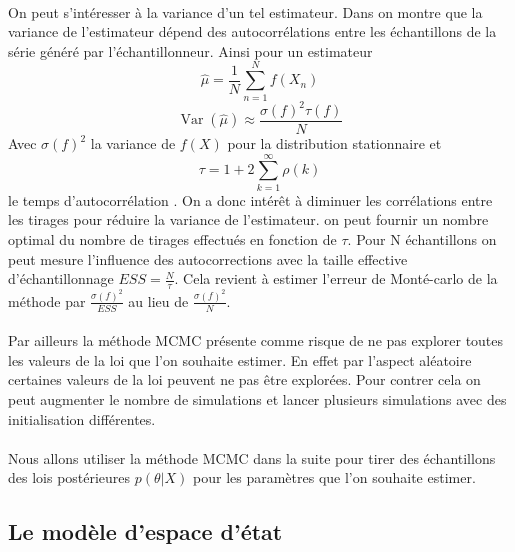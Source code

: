 \documentclass{article}
\theoremstyle{definition}
\theoremstyle{remark}
\begin{document}
\paragraph{}
On peut s'intéresser à la variance d'un tel estimateur. Dans \cite{coursgibbs} on montre que la variance de l'estimateur dépend
des autocorrélations entre les échantillons de la série généré par l'échantillonneur. 
Ainsi pour un estimateur 
\begin{equation}
	\hat{\mu}=\frac{1}{N} \sum_{n=1}^{N} f\left(X_{n}\right)
\end{equation}
\begin{equation}
	\operatorname{Var}(\hat{\mu}) \approx \frac{\sigma(f)^{2} \tau(f)}{N}
	\end{equation}
Avec $\sigma(f)^{2}$ la variance de $f(X)$ pour la distribution stationnaire et $$\tau=1+2 \sum_{k=1}^{\infty} \rho(k) $$ 
le \og{}temps d'autocorrélation \fg. On a donc intérêt à diminuer les corrélations entre les tirages pour réduire la variance de l'estimateur.
on peut fournir un nombre optimal du nombre de tirages effectués en fonction de $\tau$.
Pour N échantillons on peut mesure l'influence des autocorrections avec la taille effective d'échantillonnage
$ESS = \frac{N}{\tau}$. Cela revient à estimer l'erreur de Monté-carlo de la méthode par $\frac{\sigma(f)^{2}}{ESS}$ 
au lieu de $\frac{\sigma(f)^{2}}{N}$. 

\paragraph{}
Par ailleurs la méthode MCMC présente comme risque de ne pas explorer toutes les valeurs de la loi que l'on souhaite estimer. 
En effet par l'aspect aléatoire certaines valeurs de la loi peuvent ne pas être explorées. Pour contrer cela on peut augmenter le nombre de simulations 
et lancer plusieurs simulations avec des initialisation différentes. 
\paragraph{}
Nous allons utiliser la méthode MCMC dans la suite pour tirer des échantillons des lois postérieures $p(\theta|X)$ pour les paramètres que l'on souhaite estimer.
\subsection{Le modèle d'espace d'état}
\end{document}
